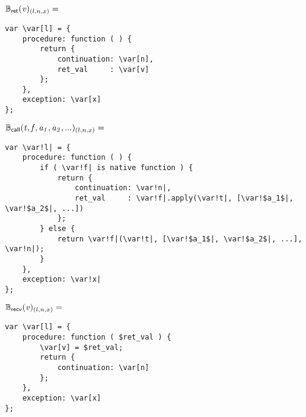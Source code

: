 \documentclass[a4j]{jsarticle}
\newcommand{\defB}[3]{{#1}({\sf #2})_{#3}}
\newcommand{\Bcall}{\defB{\mathbb{B}_{\sf call}}}
\newcommand{\Brecv}{\defB{\mathbb{B}_{\sf recv}}}
\newcommand{\Bret}{\defB{\mathbb{B}_{\sf ret}}}
\newcommand{\var}[1]{{\it #1}}
\begin{document}
$  \Bret{ \var{v} }{(l, n, x)}  =  $
\begin{Verbatim}[frame=single, commandchars=\\\[\]]
var \var[l] = {
    procedure: function ( ) {
        return {
            continuation: \var[n],
            ret_val     : \var[v]
        };
    },
    exception: \var[x]
};
\end{Verbatim}


$  \Bcall{ \var{t}, \var{f}, \var{a_1}, \var{a_2}, ... }{(l, n, x)}  =  $
\begin{Verbatim}[frame=single, commandchars=\\!|]
var \var!l| = {
    procedure: function ( ) {
        if ( \var!f| is native function ) {
            return {
                continuation: \var!n|,
                ret_val     : \var!f|.apply(\var!t|, [\var!$a_1$|, \var!$a_2$|, ...])
            };
        } else {
            return \var!f|(\var!t|, [\var!$a_1$|, \var!$a_2$|, ...], \var!n|);
        }
    },
    exception: \var!x|
};
\end{Verbatim}


$  \Brecv{ \var{v} }{(l, n, x)}  =  $
\begin{Verbatim}[frame=single, commandchars=\\\[\]]
var \var[l] = {
    procedure: function ( $ret_val ) {
        \var[v] = $ret_val;
        return {
            continuation: \var[n]
        };
    },
    exception: \var[x]
};
\end{Verbatim}
\end{document}
